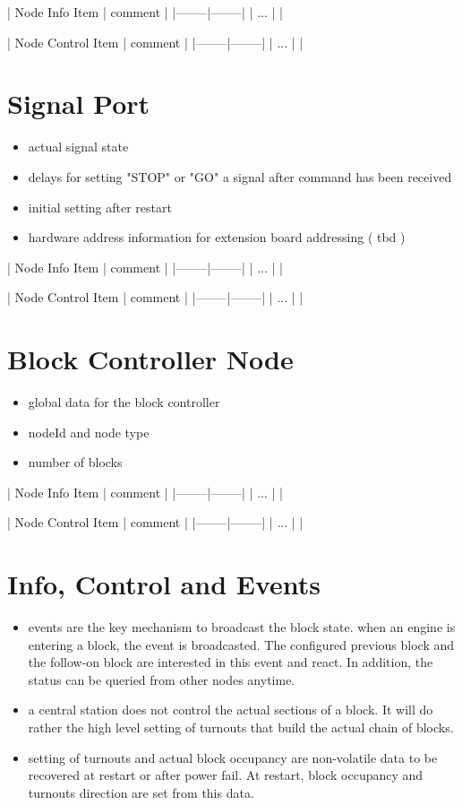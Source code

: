 | Node Info Item | comment |
|--------|--------|
| ... | |

| Node Control Item | comment |
|--------|--------|
| ... | |

\section{Signal Port}

\begin{itemize}
\item actual signal state
\item delays for setting "STOP" or "GO" a signal after command has been received
\item initial setting after restart
\item hardware address information for extension board addressing ( tbd )
\end{itemize}

| Node Info Item | comment |
|--------|--------|
| ... | |

| Node Control Item | comment |
|--------|--------|
| ... | |


\section{Block Controller Node}

\begin{itemize}
\item global data for the block controller
\item nodeId and node type
\item number of blocks
\end{itemize}

| Node Info Item | comment |
|--------|--------|
| ... | |

| Node Control Item | comment |
|--------|--------|
| ... | |


\section{Info, Control and Events}

\begin{itemize}
\item events are the key mechanism to broadcast the block state. when an engine is entering a block, the event is broadcasted. The configured previous block and the follow-on block are interested in this event and react. In addition, the status can be queried from other nodes anytime.
\item a central station does not control the actual sections of a block. It will do rather the high level setting of turnouts that build the actual chain of blocks.
\item setting of turnouts and actual block occupancy are non-volatile data to be recovered at restart or after power fail. At restart, block occupancy and turnouts direction are set from this data.
\end{itemize}

